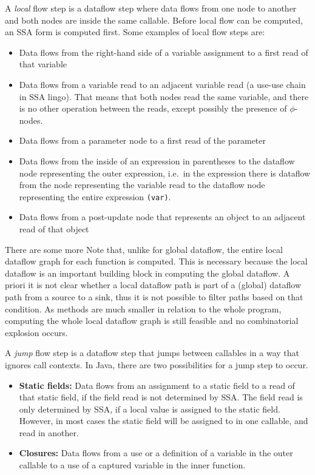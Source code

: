 A \emph{local} flow step is a dataflow step where data flows from one node to another
and both nodes are inside the same callable.
Before local flow can be computed, an SSA form is computed first.
Some examples of local flow steps are:
\begin{itemize}
    \item Data flows from the right-hand side of a variable assignment to a 
    first read of that variable
    \item Data flows from a variable read to an adjacent variable read (a use-use chain in SSA lingo).
    That means that both nodes read the same variable, and there is no other operation between the 
    reads, except possibly the presence of $\phi$-nodes.
    \item Data flows from a parameter node to a first read of the parameter
    \item Data flows from the inside of an expression in parentheses to the dataflow node
    representing the outer expression, i.e.\ in the expression  there is dataflow from the node 
    representing the variable read  to the dataflow node representing the entire expression \texttt{(var)}.
    \item Data flows from a post-update node that represents an object to an adjacent read 
    of that object
\end{itemize}
There are some more 
Note that, unlike for global dataflow, the entire local dataflow graph for each function 
is computed.
This is necessary because the local dataflow is an important building block in computing
the global dataflow.
A priori it is not clear whether a local dataflow path is part of a (global) dataflow path
from a source to a sink, thus it is not possible to filter paths based on that condition.
As methods are much smaller in relation to the whole program, computing the whole local 
dataflow graph is still feasible and no combinatorial explosion occurs.

A \emph{jump} flow step is a dataflow step that jumps between callables 
in a way that ignores call contexts.
In Java, there are two possibilities for a jump step to occur.
\begin{itemize}
    \item \textbf{Static fields:} Data flows from an assignment to a static field to a read of that static field,
    if the field read is not determined by SSA.
    The field read is only determined by SSA, if a local value is assigned to the static field.
    However, in most cases the static field will be assigned to in one callable, and read 
    in another.
    \item \textbf{Closures:} Data flows from a use or a definition of a variable in the outer callable 
    to a use of a captured variable in the inner function.
\end{itemize}

